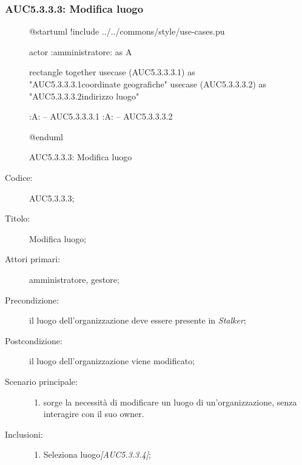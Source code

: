 \subsubsection{AUC5.3.3.3: Modifica luogo}%
\label{subs:AUC5.3.3.3}

\begin{figure}[H]
  \centering
  \begin{plantuml}
  @startuml
  !include ../../commons/style/use-cases.pu

  actor :amministratore: as A

  rectangle {
    together {
      usecase (AUC5.3.3.3.1) as "AUC5.3.3.3.1\nModifica coordinate geografiche"
      usecase (AUC5.3.3.3.2) as "AUC5.3.3.3.2\nModifica indirizzo luogo"
    }
  }

  :A: -- AUC5.3.3.3.1
  :A: -- AUC5.3.3.3.2

  @enduml
  \end{plantuml}
  \caption{AUC5.3.3.3: Modifica luogo}%
  \label{fig:AUC5_3_3_3}
\end{figure}

\begin{description}
  \item[Codice:] AUC5.3.3.3;
  \item[Titolo:] Modifica luogo;
  \item[Attori primari:] amministratore, gestore;
  \item[Precondizione:] il luogo dell'organizzazione deve essere presente in \emph{Stalker};
  \item[Postcondizione:] il luogo dell'organizzazione viene modificato;
  \item[Scenario principale:]
  \begin{enumerate}
    \item sorge la necessità di modificare un luogo di un'organizzazione, senza interagire con il suo owner.
  \end{enumerate}
  \item[Inclusioni:]
  \begin{enumerate}
    \item Seleziona luogo\emph{[AUC5.3.3.4]};
  \end{enumerate}
\end{description}

